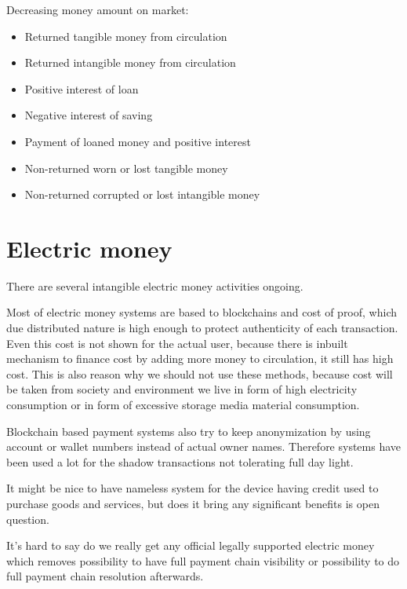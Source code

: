 Decreasing money amount on market:
\begin{itemize}
\item Returned tangible money from circulation
\item Returned intangible money from circulation
\item Positive interest of loan
\item Negative interest of saving
\item Payment of loaned money and positive interest
\item Non-returned worn or lost tangible money
\item Non-returned corrupted or lost intangible money
\end{itemize}

\section{Electric money}
There are several intangible electric money activities ongoing.

Most of electric money systems are based to blockchains and cost of proof,
which due distributed nature is high enough to protect authenticity of each
transaction. Even this cost is not shown for the actual user, because there
is inbuilt mechanism to finance cost by adding more money to circulation, it
still has high cost. This is also reason why we should not use these methods,
because cost will be taken from society and environment we live in form of
high electricity consumption or in form of excessive storage media material
consumption.

Blockchain based payment systems also try to keep anonymization by using
account or wallet numbers instead of actual owner names. Therefore systems
have been used a lot for the shadow transactions not tolerating full day
light.

It might be nice to have nameless system for the device having credit used to
purchase goods and services, but does it bring any significant benefits is
open question.

It's hard to say do we really get any official legally supported electric
money which removes possibility to have full payment chain visibility or
possibility to do full payment chain resolution afterwards.

